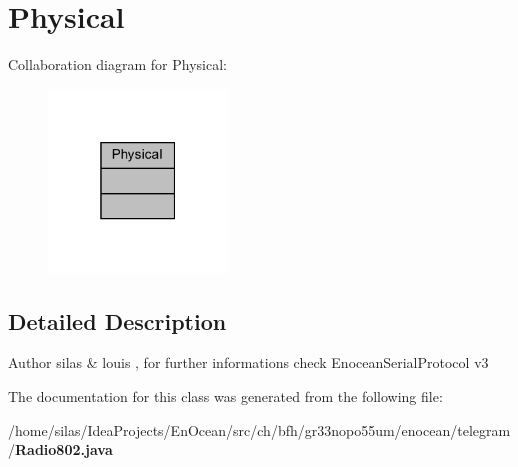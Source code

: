 \section{Physical}
\label{classPhysical}


Collaboration diagram for Physical\+:\nopagebreak
\begin{figure}[H]
\begin{center}
\leavevmode
\includegraphics[width=135pt]{d9/d7c/classPhysical__coll__graph}
\end{center}
\end{figure}


\subsection{Detailed Description}
\begin{DoxyAuthor}{Author}
silas \& louis , for further informations check Enocean\+Serial\+Protocol v3 
\end{DoxyAuthor}


The documentation for this class was generated from the following file\+:\begin{DoxyCompactItemize}
\item 
/home/silas/\+Idea\+Projects/\+En\+Ocean/src/ch/bfh/gr33nopo55um/enocean/telegram/{\bf Radio802.\+java}\end{DoxyCompactItemize}
